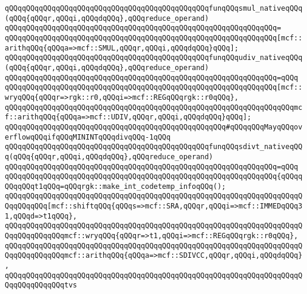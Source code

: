 \newline
\verb|qQQqqQQqqQQqqQQqqQQqqQQqqQQqqQQqqQQqqQQqqQQqqQQqfunqQQqsmul_nativeqQQq(qQQq{qQQqr,qQQqi,qQQqdqQQq},qQQqreduce_operand)|\newline
\verb|qQQqqQQqqQQqqQQqqQQqqQQqqQQqqQQqqQQqqQQqqQQqqQQqqQQqqQQqqQQqqQQq=|\newline
\verb|qQQqqQQqqQQqqQQqqQQqqQQqqQQqqQQqqQQqqQQqqQQqqQQqqQQqqQQqqQQqqQQq[mcf::arithqQQq{qQQqa=>mcf::SMUL,qQQqr,qQQqi,qQQqdqQQq}qQQq];|\newline
\newline
\verb|qQQqqQQqqQQqqQQqqQQqqQQqqQQqqQQqqQQqqQQqqQQqqQQqfunqQQqudiv_nativeqQQq(qQQq{qQQqr,qQQqi,qQQqdqQQq},qQQqreduce_operand)|\newline
\verb|qQQqqQQqqQQqqQQqqQQqqQQqqQQqqQQqqQQqqQQqqQQqqQQqqQQqqQQqqQQqqQQq=qQQq|\newline
\verb|qQQqqQQqqQQqqQQqqQQqqQQqqQQqqQQqqQQqqQQqqQQqqQQqqQQqqQQqqQQqqQQq[mcf::wryqQQq{qQQqr=>rgk::r0,qQQqi=>mcf::REGqQQqrgk::r0qQQq},|\newline
\verb|qQQqqQQqqQQqqQQqqQQqqQQqqQQqqQQqqQQqqQQqqQQqqQQqqQQqqQQqqQQqqQQqqQQqmcf::arithqQQq{qQQqa=>mcf::UDIV,qQQqr,qQQqi,qQQqdqQQq}qQQq];|\newline
\newline
\verb|qQQqqQQqqQQqqQQqqQQqqQQqqQQqqQQqqQQqqQQqqQQqqQQqqQQq#qQQqqQQqMayqQQqoverflowqQQqifqQQqMININTqQQqdivqQQq-1qQQq|\newline
\verb|qQQqqQQqqQQqqQQqqQQqqQQqqQQqqQQqqQQqqQQqqQQqqQQqfunqQQqsdivt_nativeqQQq(qQQq{qQQqr,qQQqi,qQQqdqQQq},qQQqreduce_operand)|\newline
\verb|qQQqqQQqqQQqqQQqqQQqqQQqqQQqqQQqqQQqqQQqqQQqqQQqqQQqqQQqqQQqqQQq=qQQq|\newline
\verb|qQQqqQQqqQQqqQQqqQQqqQQqqQQqqQQqqQQqqQQqqQQqqQQqqQQqqQQqqQQqqQQq{qQQqqQQqqQQqt1qQQq=qQQqrgk::make_int_codetemp_infoqQQq();|\newline
\newline
\verb|qQQqqQQqqQQqqQQqqQQqqQQqqQQqqQQqqQQqqQQqqQQqqQQqqQQqqQQqqQQqqQQqqQQqqQQqqQQqqQQq[mcf::shiftqQQq{qQQqs=>mcf::SRA,qQQqr,qQQqi=>mcf::IMMEDqQQq31,qQQqd=>t1qQQq},|\newline
\verb|qQQqqQQqqQQqqQQqqQQqqQQqqQQqqQQqqQQqqQQqqQQqqQQqqQQqqQQqqQQqqQQqqQQqqQQqqQQqqQQqqQQqmcf::wryqQQq{qQQqr=>t1,qQQqi=>mcf::REGqQQqrgk::r0qQQq},|\newline
\verb|qQQqqQQqqQQqqQQqqQQqqQQqqQQqqQQqqQQqqQQqqQQqqQQqqQQqqQQqqQQqqQQqqQQqqQQqqQQqqQQqqQQqmcf::arithqQQq{qQQqa=>mcf::SDIVCC,qQQqr,qQQqi,qQQqdqQQq},|\newline
\verb|qQQqqQQqqQQqqQQqqQQqqQQqqQQqqQQqqQQqqQQqqQQqqQQqqQQqqQQqqQQqqQQqqQQqqQQqqQQqqQQqqQQqtvs|\newline

